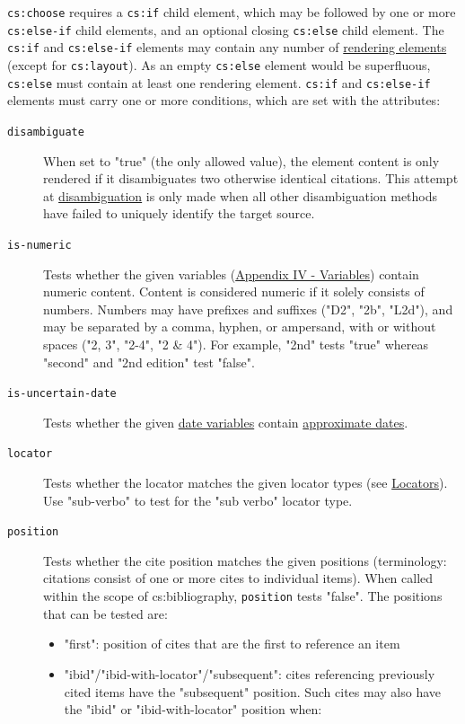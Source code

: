 \texttt{cs:choose} requires a \texttt{cs:if} child element, which may be
followed by one or more \texttt{cs:else-if} child elements, and an
optional closing \texttt{cs:else} child element. The \texttt{cs:if} and
\texttt{cs:else-if} elements may contain any number of
\protect\hyperlink{rendering-elements}{rendering elements} (except for
\texttt{cs:layout}). As an empty \texttt{cs:else} element would be
superfluous, \texttt{cs:else} must contain at least one rendering
element. \texttt{cs:if} and \texttt{cs:else-if} elements must carry one
or more conditions, which are set with the attributes:

\begin{description}
\item[\texttt{disambiguate}]
When set to "true" (the only allowed value), the element content is only
rendered if it disambiguates two otherwise identical citations. This
attempt at \protect\hyperlink{disambiguation}{disambiguation} is only
made when all other disambiguation methods have failed to uniquely
identify the target source.
\item[\texttt{is-numeric}]
Tests whether the given variables
(\protect\hyperlink{appendix-iv---variables}{Appendix IV - Variables})
contain numeric content. Content is considered numeric if it solely
consists of numbers. Numbers may have prefixes and suffixes ("D2", "2b",
"L2d"), and may be separated by a comma, hyphen, or ampersand, with or
without spaces ("2, 3", "2-4", "2 \& 4"). For example, "2nd" tests
"true" whereas "second" and "2nd edition" test "false".
\item[\texttt{is-uncertain-date}]
Tests whether the given \protect\hyperlink{date-variables}{date
variables} contain \protect\hyperlink{approximate-dates}{approximate
dates}.
\item[\texttt{locator}]
Tests whether the locator matches the given locator types (see
\protect\hyperlink{locators}{Locators}). Use "sub-verbo" to test for the
"sub verbo" locator type.
\item[\texttt{position}]
Tests whether the cite position matches the given positions
(terminology: citations consist of one or more cites to individual
items). When called within the scope of cs:bibliography,
\texttt{position} tests "false". The positions that can be tested are:

\begin{itemize}
\item
  "first": position of cites that are the first to reference an item
\item
  "ibid"/"ibid-with-locator"/"subsequent": cites referencing previously
  cited items have the "subsequent" position. Such cites may also have
  the "ibid" or "ibid-with-locator" position when:


\end{itemize}
\end{description}
